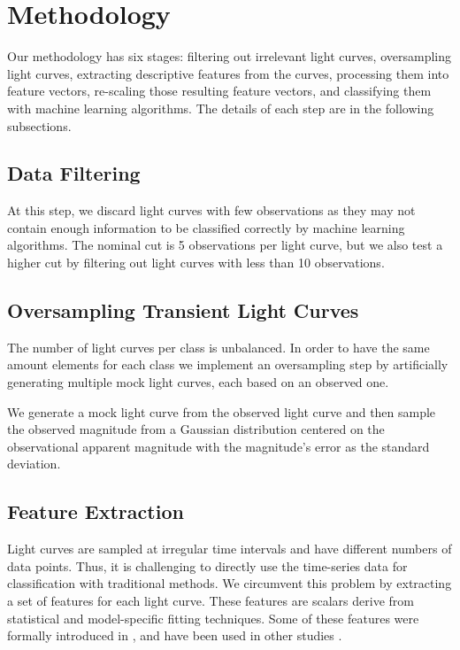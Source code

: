 \documentclass[a4paper,fleqn,usenatbib]{mnras}
\begin{document}
\section{Methodology} \label{section_method}

Our methodology has six stages: 
filtering out irrelevant light curves, oversampling light curves, extracting
descriptive features from the curves, processing them into feature
vectors, re-scaling those resulting feature vectors, and 
classifying them with machine learning algorithms. 
The details of each step are in the following subsections.

\subsection{Data Filtering} \label{subsection_filtering}

At this step, we discard light curves with few observations as they may not contain
enough information to be classified correctly by machine learning
algorithms.  
The nominal cut is 5 observations per light curve, but we also test a
higher cut by filtering out light curves with less than 10 observations.

\subsection{Oversampling Transient Light Curves} \label{subsection_oversampling}

The number of light curves per class is unbalanced. 
In order to have the same amount elements for each class we implement an
oversampling step by artificially generating multiple mock light curves,
each based on an observed one. 

We generate a mock light curve from the observed light curve and 
then sample the observed magnitude from a Gaussian distribution
centered on the observational apparent magnitude with the magnitude's
error as the  standard deviation. 


\subsection{Feature Extraction} \label{subsection_extraction}

Light curves are sampled at irregular time intervals and have
different numbers of data points.
Thus, it is challenging to directly use the time-series data for
classification with traditional methods.
We circumvent this problem by extracting a set of features for each
light curve.
These features are scalars derive from statistical and model-specific
fitting techniques.
Some of these features were formally introduced in
\cite{1101.1959}, and have been used in other studies
\citep{1603.00882,1601.03931}.  
\end{document}
